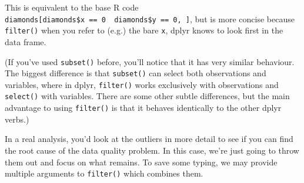 \begin{Shaded}
\begin{Highlighting}[]
\StringTok{ } \NormalTok{|}\StringTok{ }\StringTok{ }\NormalTok{)}
\CommentTok{#> }
\end{Highlighting}
\end{Shaded}

This is equivalent to the base R code
\texttt{diamonds{[}diamonds\$x\ ==\ 0\ \textbar{}\ diamonds\$y\ ==\ 0,\ {]}},
but is more concise because \texttt{filter()} when you refer to (e.g.)
the bare \texttt{x}, dplyr knows to look first in the data frame.

(If you've used \texttt{subset()} before, you'll notice that it has very
similar behaviour. The biggest difference is that \texttt{subset()} can
select both observations and variables, where in dplyr,
\texttt{filter()} works exclusively with observations and
\texttt{select()} with variables. There are some other subtle
differences, but the main advantage to using \texttt{filter()} is that
it behaves identically to the other dplyr verbs.)

In a real analysis, you'd look at the outliers in more detail to see if
you can find the root cause of the data quality problem. In this case,
we're just going to throw them out and focus on what remains. To save
some typing, we may provide multiple arguments to \texttt{filter()}
which combines them.

